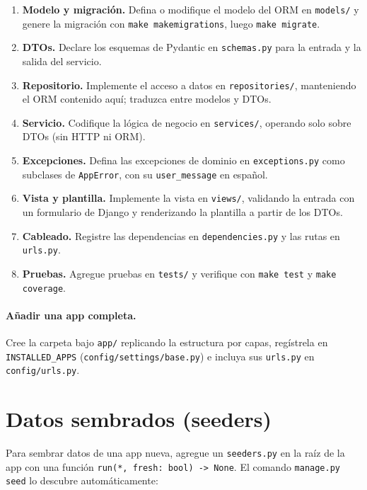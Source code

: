 \documentclass[12pt,letterpaper]{report}
\begin{document}
\begin{enumerate}[leftmargin=1.5em]
  \item \textbf{Modelo y migración.} Defina o modifique el modelo del ORM en
        \texttt{models/} y genere la migración con \texttt{make makemigrations},
        luego \texttt{make migrate}.
  \item \textbf{DTOs.} Declare los esquemas de Pydantic en \texttt{schemas.py}
        para la entrada y la salida del servicio.
  \item \textbf{Repositorio.} Implemente el acceso a datos en
        \texttt{repositories/}, manteniendo el ORM contenido aquí; traduzca entre
        modelos y DTOs.
  \item \textbf{Servicio.} Codifique la lógica de negocio en \texttt{services/},
        operando solo sobre DTOs (sin HTTP ni ORM).
  \item \textbf{Excepciones.} Defina las excepciones de dominio en
        \texttt{exceptions.py} como subclases de \texttt{AppError}, con su
        \texttt{user\_message} en español.
  \item \textbf{Vista y plantilla.} Implemente la vista en \texttt{views/},
        validando la entrada con un formulario de Django y renderizando la
        plantilla a partir de los DTOs.
  \item \textbf{Cableado.} Registre las dependencias en \texttt{dependencies.py} y
        las rutas en \texttt{urls.py}.
  \item \textbf{Pruebas.} Agregue pruebas en \texttt{tests/} y verifique con
        \texttt{make test} y \texttt{make coverage}.
\end{enumerate}

\paragraph{Añadir una app completa.} Cree la carpeta bajo \texttt{app/} replicando
la estructura por capas, regístrela en \texttt{INSTALLED\_APPS}
(\texttt{config/settings/base.py}) e incluya sus \texttt{urls.py} en
\texttt{config/urls.py}.

\section{Datos sembrados (seeders)}

Para sembrar datos de una app nueva, agregue un \texttt{seeders.py} en la raíz de
la app con una función \texttt{run(*, fresh: bool) -> None}. El comando
\texttt{manage.py seed} lo descubre automáticamente:
\end{document}
